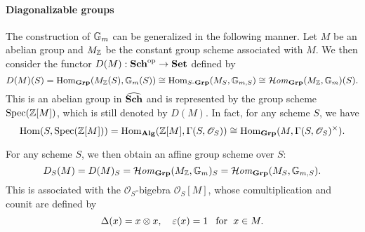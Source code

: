 \paragraph{Diagonalizable groups}\label{scheme diagonalizable group paragraph}
The construction of $\mathbb{G}_m$ can be generalized in the following manner. Let $M$ be an abelian group and $M_{\mathbb{Z}}$ be the constant group scheme associated with $M$. We then consider the functor $D(M):\mathbf{Sch}^{\mathrm{op}}\to\mathbf{Set}$ defined by
\[D(M)(S)=\mathrm{Hom}_{\mathbf{Grp}}(M_{\mathbb{Z}}(S),\mathbb{G}_m(S))\cong \mathrm{Hom}_{S\textup{-}\mathbf{Grp}}(M_S,\mathbb{G}_{m,S})\cong \operatorname{\mathcal{H}\hspace*{-0.4pt}\textit{om}\hspace{0.5pt}}_{\mathbf{Grp}}(M_{\mathbb{Z}},\mathbb{G}_m)(S).\]
This is an abelian group in $\widehat{\mathbf{Sch}}$ and is represented by the group scheme $\mathrm{Spec}(\mathbb{Z}[M])$, which is still denoted by $D(M)$. In fact, for any scheme $S$, we have
\[\mathrm{Hom}(S,\mathrm{Spec}(\mathbb{Z}[M]))=\mathrm{Hom}_{\mathbf{Alg}}(\mathbb{Z}[M],\Gamma(S,\mathscr{O}_S))\cong\mathrm{Hom}_{\mathbf{Grp}}(M,\Gamma(S,\mathscr{O}_S)^{\times}).\]

For any scheme $S$, we then obtain an affine group scheme over $S$:
\[D_S(M)=D(M)_S=\operatorname{\mathcal{H}\hspace*{-0.4pt}\textit{om}\hspace{0.5pt}}_{\mathbf{Grp}}(M_{\mathbb{Z}},\mathbb{G}_m)_S=\operatorname{\mathcal{H}\hspace*{-0.4pt}\textit{om}\hspace{0.5pt}}_{\mathbf{Grp}}(M_S,\mathbb{G}_{m,S}).\]
This is associated with the $\mathscr{O}_S$-bigebra $\mathscr{O}_S[M]$, whose comultiplication and counit are defined by
\[\Delta(x)=x\otimes x,\quad \varepsilon(x)=1\hspace{8pt}\text{for}\hspace{6pt} x\in M.\]

